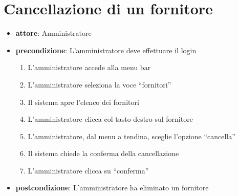 \section{Cancellazione di un fornitore}
\begin{itemize}
	\item \textbf{attore}: Amministratore
	\item \textbf{precondizione}: L’amministratore deve effettuare il login

	\begin{enumerate}
		\item L’amministratore accede alla menu bar
		\item L’amministratore seleziona la voce “fornitori”
		\item Il sistema apre l’elenco dei fornitori
		\item L’amministratore clicca col tasto destro sul fornitore
		\item L’amministratore, dal menu a tendina, sceglie l’opzione “cancella”
		\item Il sistema chiede la conferma della cancellazione
		\item L’amministratore clicca su “conferma”
	\end{enumerate}

	\item \textbf{postcondizione}: L’amministratore ha eliminato un fornitore
\end{itemize}


